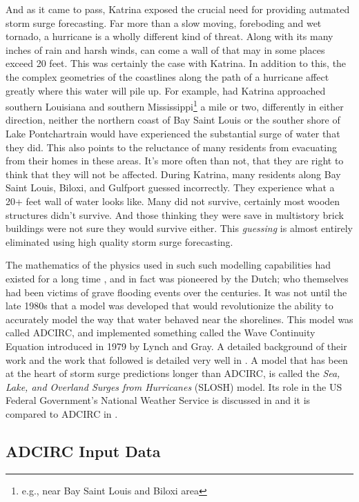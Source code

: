 \documentclass{article}
\begin{document}
And as it came to pass, Katrina exposed the crucial need for providing autmated
storm surge forecasting.  Far more than a slow moving, foreboding and wet
tornado, a hurricane is a wholly different kind of threat. Along with its many
inches of rain and harsh winds, can come a wall of that may in some places
exceed 20 feet. This was certainly the case with Katrina. In addition to this,
the the complex geometries of the coastlines along the path of a hurricane
affect greatly where this water will pile up. For example, had Katrina
approached southern Louisiana and southern Mississippi\footnote{e.g., near Bay
Saint Louis and Biloxi area} a mile or two, differently in either direction,
neither the northern coast of Bay Saint Louis or the souther shore of Lake
Pontchartrain would have experienced the substantial surge of water that they
did. This also points to the reluctance of many residents from evacuating from
their homes in these areas. It's more often than not, that they are right to
think that they will not be affected. During Katrina, many residents along Bay
Saint Louis, Biloxi, and Gulfport guessed incorrectly. They experience what a
20+ feet wall of water looks like. Many did not survive, certainly most wooden
structures didn't survive. And those thinking they were save in multistory brick
buildings were not sure they would survive either. This \textit{guessing} is
almost entirely eliminated using high quality storm surge forecasting.

The mathematics of the physics used in such such modelling capabilities had
existed for a long time \cite{luettich1992adcirc}, and in fact was pioneered by
the Dutch; who themselves had been victims of grave flooding events over the
centuries. It was not until the late 1980s that a model was developed that would
revolutionize the ability to accurately model the way that water behaved near
the shorelines. This model was called ADCIRC, and implemented something called
the Wave Continuity Equation introduced in 1979 by Lynch and
Gray\cite{lynch1979wave}. A detailed background of their work and the work that
followed is detailed very well in \cite{dresback2005form}.  A model that has
been at the heart of storm surge predictions longer than ADCIRC, is called the
\textit{Sea, Lake, and Overland Surges from Hurricanes} (SLOSH) model. Its role
in the US Federal Government's National Weather Service is discussed in
\cite{glahn2009role} and it is compared to ADCIRC in \cite{turan2018comparison}.

\subsection{ADCIRC Input Data}
\end{document}
